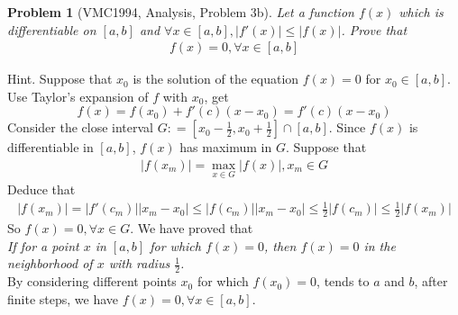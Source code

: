 \documentclass{article}
\newtheorem{problem}{Problem}
\begin{document}
\begin{problem}[VMC1994, Analysis, Problem 3b]
	Let a function $f(x)$ which is differentiable on $[a,b]$ and $\forall x \in \left[ {a,b} \right],\left| {f'\left( x \right)} \right| \le \left| {f\left( x \right)} \right|$. Prove that
	\begin{align}
		f\left( x \right) = 0,\forall x \in \left[ {a,b} \right]
	\end{align}
\end{problem}
{\sf Hint.} Suppose that $x_0$ is the solution of the equation $f(x)=0$ for $x_0 \in [a,b]$. Use Taylor's expansion of $f$ with $x_0$, get
\begin{equation}
	f\left( x \right) = f\left( {{x_0}} \right) + f'\left( c \right)\left( {x - {x_0}} \right) = f'\left( c \right)\left( {x - {x_0}} \right)
\end{equation}
Consider the close interval $G: = \left[ {{x_0} - \frac{1}{2},{x_0} + \frac{1}{2}} \right] \cap \left[ {a,b} \right]$. Since $f(x)$ is differentiable in $[a,b]$, $f(x)$ has maximum in $G$. Suppose that
\begin{align}
	\left| {f\left( {{x_m}} \right)} \right| = \mathop {\max }\limits_{x \in G} \left| {f\left( x \right)} \right|,{x_m} \in G
\end{align}
Deduce that
\begin{align}
	\left| {f\left( {{x_m}} \right)} \right| = \left| {f'\left( {{c_m}} \right)} \right|\left| {{x_m} - {x_0}} \right| \le \left| {f\left( {{c_m}} \right)} \right|\left| {{x_m} - {x_0}} \right| \le \frac{1}{2}\left| {f\left( {{c_m}} \right)} \right| \le \frac{1}{2}\left| {f\left( {{x_m}} \right)} \right|
\end{align}
So $f\left( x \right) = 0,\forall x \in G$. We have proved that\\ \textit{If for a point $x$ in $[a,b]$ for which $f(x)=0$, then $f(x)=0$ in the neighborhood of $x$ with radius $\frac{1}{2}$.}\\
By considering different points $x_0$ for which $f(x_0)=0$, tends to $a$ and $b$, after finite steps, we have $f\left( x \right) = 0,\forall x \in \left[ {a,b} \right]$.
\end{document}
